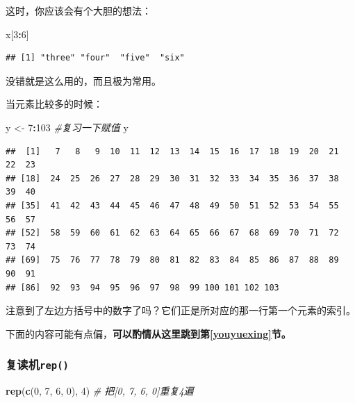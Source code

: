 \documentclass[]{book}
\newenvironment{Shaded}{\begin{snugshade}}{\end{snugshade}}
\newcommand{\CommentTok}[1]{\textcolor[rgb]{0.56,0.35,0.01}{\textit{#1}}}
\newcommand{\DecValTok}[1]{\textcolor[rgb]{0.00,0.00,0.81}{#1}}
\newcommand{\KeywordTok}[1]{\textcolor[rgb]{0.13,0.29,0.53}{\textbf{#1}}}
\newcommand{\NormalTok}[1]{#1}
\newcommand{\OperatorTok}[1]{\textcolor[rgb]{0.81,0.36,0.00}{\textbf{#1}}}
\newcommand{\StringTok}[1]{\textcolor[rgb]{0.31,0.60,0.02}{#1}}
\begin{document}
这时，你应该会有个大胆的想法：

\begin{Shaded}
\begin{Highlighting}[]
\NormalTok{x[}\DecValTok{3}\OperatorTok{:}\DecValTok{6}\NormalTok{]}
\end{Highlighting}
\end{Shaded}

\begin{verbatim}
## [1] "three" "four"  "five"  "six"
\end{verbatim}

没错就是这么用的，而且极为常用。

当元素比较多的时候：

\begin{Shaded}
\begin{Highlighting}[]
\NormalTok{y <-}\StringTok{ }\DecValTok{7}\OperatorTok{:}\DecValTok{103} \CommentTok{#复习一下赋值}
\NormalTok{y}
\end{Highlighting}
\end{Shaded}

\begin{verbatim}
##  [1]   7   8   9  10  11  12  13  14  15  16  17  18  19  20  21  22  23
## [18]  24  25  26  27  28  29  30  31  32  33  34  35  36  37  38  39  40
## [35]  41  42  43  44  45  46  47  48  49  50  51  52  53  54  55  56  57
## [52]  58  59  60  61  62  63  64  65  66  67  68  69  70  71  72  73  74
## [69]  75  76  77  78  79  80  81  82  83  84  85  86  87  88  89  90  91
## [86]  92  93  94  95  96  97  98  99 100 101 102 103
\end{verbatim}

注意到了左边方括号中的数字了吗？它们正是所对应的那一行第一个元素的索引。

下面的内容可能有点偏，\textbf{可以酌情从这里跳到第\ref{youyuexing}节。}

\hypertarget{rep}{%
\subsubsection{\texorpdfstring{复读机\texttt{rep()}}{复读机rep()}}\label{rep}}

\begin{Shaded}
\begin{Highlighting}[]
\KeywordTok{rep}\NormalTok{(}\KeywordTok{c}\NormalTok{(}\DecValTok{0}\NormalTok{, }\DecValTok{7}\NormalTok{, }\DecValTok{6}\NormalTok{, }\DecValTok{0}\NormalTok{), }\DecValTok{4}\NormalTok{) }\CommentTok{# 把[0, 7, 6, 0]重复4遍}
\end{Highlighting}
\end{Shaded}
\end{document}
